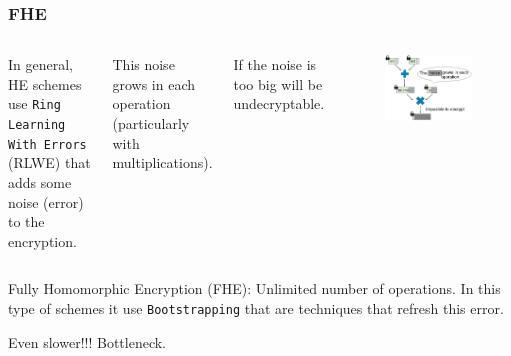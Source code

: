 \documentclass[10pt]{beamer}
\begin{document}



\begin{frame}
    \frametitle{FHE}
  \begin{columns}
      In general, HE schemes use \texttt{Ring Learning With Errors} (RLWE) that
      adds some noise (error) to the encryption.

\vspace{0.3cm}
    This noise grows in each operation (particularly with multiplications).

\vspace{0.3cm}
      If the noise is too big will be undecryptable.
        \begin{figure}[h!]
            \centering
            \includegraphics[scale=0.2]{multNoise.jpg}
        \end{figure}



\end{columns}

    Fully Homomorphic Encryption (FHE): Unlimited number of operations. In this type of schemes
    it use \texttt{Bootstrapping} that are techniques that refresh this error.

    Even slower!!! Bottleneck.

\end{frame}

\end{document}
